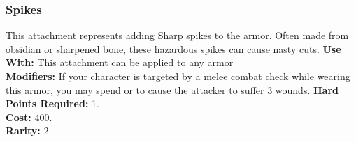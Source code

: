 \subsubsection{Spikes}
This attachment represents adding Sharp spikes to the armor.
Often made from obsidian or sharpened bone, these hazardous
spikes can cause nasty cuts.
\textbf{Use With:} This attachment can be applied to any armor\\
\textbf{Modifiers:} If your character is targeted by a melee
    combat check while wearing this armor, you may spend
    \threat\threat\threat or \despair to cause the attacker to suffer 3 wounds.
\textbf{Hard Points Required:} 1.\\
\textbf{Cost:} 400.\\
\textbf{Rarity:} 2.\\
